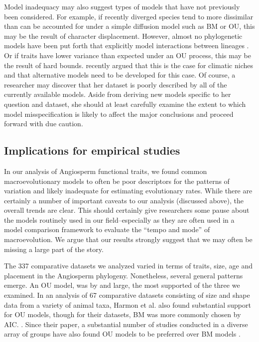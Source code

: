 Model inadequacy may also suggest types of models that have not previously been considered. For example, if recently diverged species tend to more dissimilar than can be accounted for under a simple diffusion model such as BM or OU, this may be the result of character displacement. However, almost no phylogenetic models have been put forth that explicitly model interactions between lineages \citep[but see][]{NuismerHarmon}. Or if traits have lower variance than expected under an OU process, this may be the result of hard bounds. \citet{Davies2014} recently argued that this is the case for climatic niches and that alternative models need to be developed for this case. Of course, a researcher may discover that her dataset is poorly described by all of the currently available models. Aside from deriving new models specific to her question and dataset, she should at least carefully examine the extent to which model misspecification is likely to affect the major conclusions and proceed forward with due caution.
 
\subsection{Implications for empirical studies}

In our analysis of Angiosperm functional traits, we found common macroevolutionary models to often be poor descriptors for the patterns of variation and likely inadequate for estimating evolutionary rates. While there are certainly a number of important caveats to our analysis (discussed above), the overall trends are clear. This should certainly give researchers some pause about the models routinely used in our field--especially as they are often used in a model comparison framework to evaluate the ``tempo and mode'' of macroevolution. We argue that our results strongly suggest that we may often be missing a large part of the story.

The 337 comparative datasets we analyzed varied in terms of traits, size, age and placement in the Angiosperm phylogeny. Nonetheless, several general patterns emerge. An OU model, was by and large, the most supported of the three we examined. In an analysis of 67 comparative datasets consisting of size and shape data from a variety of animal taxa, Harmon et al. \citep{Harmon2010} also found substantial support for OU models, though for their datasets, BM was more commonly chosen by AIC. \citep[We note, however, that many of their datasets were quite small; see][]{SlaterPennell}. Since their paper, a substantial number of studies conducted in a diverse array of groups have also found OU models to be preferred over BM models \citep[e.g.,][]{Burbrink2012, Wiens2013, Lopez2013, Thomaspreprint}. 

